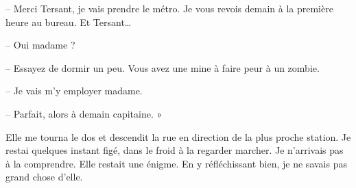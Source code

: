 -- Merci Tersant, je vais prendre le métro. Je vous revois demain à la première heure au bureau. Et Tersant… 

-- Oui madame ?

-- Essayez de dormir un peu. Vous avez une mine à faire peur à un zombie.

-- Je vais m'y employer madame. 

-- Parfait, alors à demain capitaine. »

Elle me tourna le dos et descendit la rue en direction de la plus proche station. Je restai quelques instant figé, dans
le froid à la regarder marcher. Je n'arrivais pas à la comprendre. Elle restait une énigme. En y réfléchissant bien, je
ne savais pas grand chose d'elle.